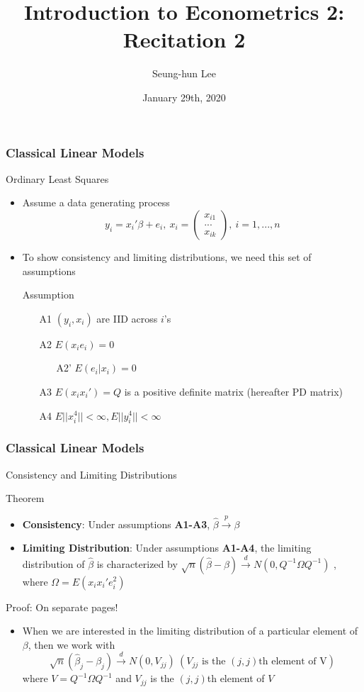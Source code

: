 \documentclass{beamer}
\title[Econometrics 2]{Introduction to Econometrics 2: Recitation 2} %
\author{Seung-hun Lee}
\institute{Columbia University}
\date{January 29th, 2020}
\begin{document}
\begin{frame}
\titlepage
\end{frame}


\begin{frame}
\frametitle{Classical Linear Models}
Ordinary Least Squares
\begin{itemize}
\item Assume a data generating process 
\[
y_i = x_i'\beta+e_i, \ x_i = \begin{pmatrix} x_{i1} \\ ... \\ x_{ik}\end{pmatrix}, \ i=1,...,n
\]
\item To show consistency and limiting distributions, we need this set of assumptions
\begin{block}{Assumption}
\begin{itemize}
\item[A1] $(y_i, x_i)$ are IID across $i$'s
\item[A2] $E(x_ie_i)=0$
\begin{itemize}
\item[A2'] $E(e_i|x_i)=0$ 
\end{itemize}
\item[A3] $E(x_ix_i')=Q$ is a positive definite matrix (hereafter PD matrix)
\item[A4] $E||x_i^4||<\infty, E||y_i^4||<\infty$
\end{itemize}
\end{block}
\end{itemize}
\end{frame}

\begin{frame}
\frametitle{Classical Linear Models}
Consistency and Limiting Distributions
\begin{block}{Theorem}
\begin{itemize}
\item \textbf{Consistency}: Under assumptions \textbf{A1-A3}, $\hat{\beta}\xrightarrow{p}\beta$
\item \textbf{Limiting Distribution}: Under assumptions \textbf{A1-A4}, the limiting distribution of $\hat{\beta}$ is characterized by $\sqrt{n}(\hat{\beta}-\beta)\xrightarrow{d}N(0,Q^{-1}\Omega Q^{-1})$ , where $\Omega = E(x_ix_i'e_i^2)$
\end{itemize}
\end{block}
Proof: On separate pages!
\begin{itemize}
\item When we are interested in the limiting distribution of a particular element of $\beta$, then we work with
\[
\sqrt{n}(\hat{\beta}_j-\beta_j) \xrightarrow{d} N(0,V_{jj}) \ (V_{jj} \text{ is the $(j,j)$th element of V})
\]
where $V=Q^{-1}\Omega Q^{-1}$ and $V_{jj}$ is the $(j,j)$th element of $V$
\end{itemize}
\end{frame}
\end{document}
